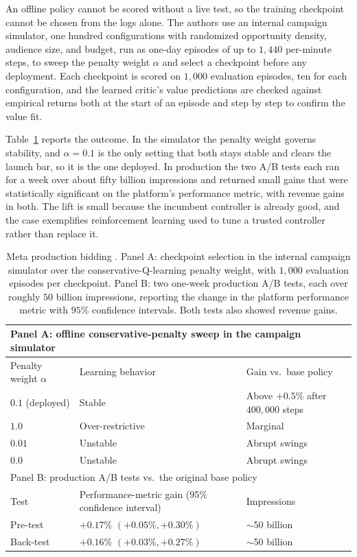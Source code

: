 An offline policy cannot be scored without a live test, so the training checkpoint cannot be chosen from the logs alone. The authors use an internal campaign simulator, one hundred configurations with randomized opportunity density, audience size, and budget, run as one-day episodes of up to $1{,}440$ per-minute steps, to sweep the penalty weight $\alpha$ and select a checkpoint before any deployment. Each checkpoint is scored on $1{,}000$ evaluation episodes, ten for each configuration, and the learned critic's value predictions are checked against empirical returns both at the start of an episode and step by step to confirm the value fit.

Table~\ref{tab:meta_bidding_results} reports the outcome. In the simulator the penalty weight governs stability, and $\alpha=0.1$ is the only setting that both stays stable and clears the launch bar, so it is the one deployed. In production the two A/B tests each ran for a week over about fifty billion impressions and returned small gains that were statistically significant on the platform's performance metric, with revenue gains in both. The lift is small because the incumbent controller is already good, and the case exemplifies reinforcement learning used to tune a trusted controller rather than replace it.

\begin{table}[t]
\centering
\small
\begin{tabular}{lll}
\toprule
\multicolumn{3}{l}{Panel A: offline conservative-penalty sweep in the campaign simulator} \\
\midrule
Penalty weight $\alpha$ & Learning behavior & Gain vs.\ base policy \\
\midrule
$0.1$ (deployed) & Stable & Above $+0.5\%$ after $400{,}000$ steps \\
$1.0$ & Over-restrictive & Marginal \\
$0.01$ & Unstable & Abrupt swings \\
$0.0$ & Unstable & Abrupt swings \\
\midrule
\multicolumn{3}{l}{Panel B: production A/B tests vs.\ the original base policy} \\
\midrule
Test & Performance-metric gain (95\% confidence interval) & Impressions \\
\midrule
Pre-test & $+0.17\%$ $(+0.05\%, +0.30\%)$ & $\sim$50 billion \\
Back-test & $+0.16\%$ $(+0.03\%, +0.27\%)$ & $\sim$50 billion \\
\bottomrule
\end{tabular}
\caption{Meta production bidding \citep{Korenkevych2023MetaBidding}. Panel A: checkpoint selection in the internal campaign simulator over the conservative-Q-learning penalty weight, with $1{,}000$ evaluation episodes per checkpoint. Panel B: two one-week production A/B tests, each over roughly $50$ billion impressions, reporting the change in the platform performance metric with $95\%$ confidence intervals. Both tests also showed revenue gains.}
\label{tab:meta_bidding_results}
\end{table}

